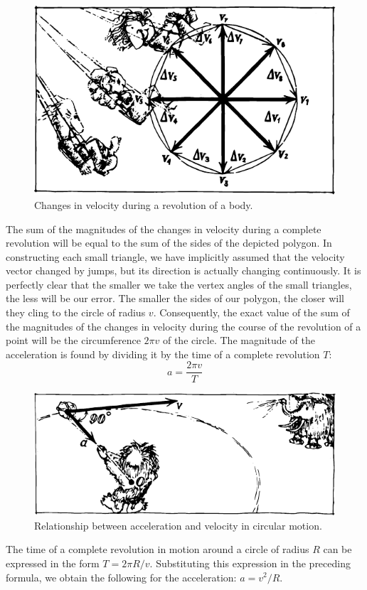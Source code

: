 \begin{figure}[!ht]
\centering
\includegraphics[width=\textwidth]{figures/fig-02-05.pdf}
\caption{Changes in velocity during a revolution of a body.}
\label{fig-2.05}
\end{figure}
The sum of the magnitudes of the changes in velocity
during a complete revolution will be equal to the sum
of the sides of the depicted polygon. In constructing each
small triangle, we have implicitly assumed that the
velocity vector changed by jumps, but its direction is
actually changing continuously. It is perfectly clear that
the smaller we take the vertex angles of the small triangles, the less will be our error. The smaller the sides of our polygon, the closer will they cling to the circle of radius $v$. Consequently, the exact value of the sum of the magnitudes of the changes in velocity during the course of the revolution of a point will be the circumference
$2\pi v$ of the circle. The magnitude of the acceleration is found by dividing it by the time of a complete revolution $T$: 
\begin{equation*}
a = \frac{2\pi v}{T}
\end{equation*}
\begin{figure}[!ht]
\centering
\includegraphics[width=\textwidth]{figures/fig-02-06.pdf}
\caption{Relationship between acceleration and velocity in circular motion.}
\label{fig-2.06}
\end{figure}
The time of a complete revolution in motion around
a circle of radius $R$ can be expressed in the form $T
= 2 \pi R/v$. Substituting this expression in the preceding
formula, we obtain the following for the acceleration:
$a = v^{2}/R$.

